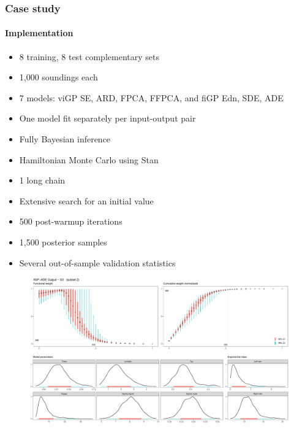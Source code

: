 \documentclass{snedecorbeamer}
\begin{document}
\begin{frame}
  \frametitle{Case study}
  \framesubtitle{Implementation}

  \begin{itemize}
  \item 8 training, 8 test complementary sets
  \item 1,000 soundings each
  \item 7 models: viGP SE, ARD, FPCA, FFPCA, and fiGP Edn, SDE, ADE
  \item One model fit separately per input-output pair
  \item Fully Bayesian inference
  \item Hamiltonian Monte Carlo using Stan
  \item 1 long chain
  \item Extensive search for an initial value
  \item 500 post-warmup iterations
  \item 1,500 posterior samples
  \item Several out-of-sample validation statistics
  \end{itemize}
\end{frame}

\begin{frame}
  \begin{figure}
    \centering
    \includegraphics[width=.95\textwidth]{param-band2-unk-2-fiGP-ADE-1-O3.pdf}
  \end{figure}
\end{frame}
\end{document}
